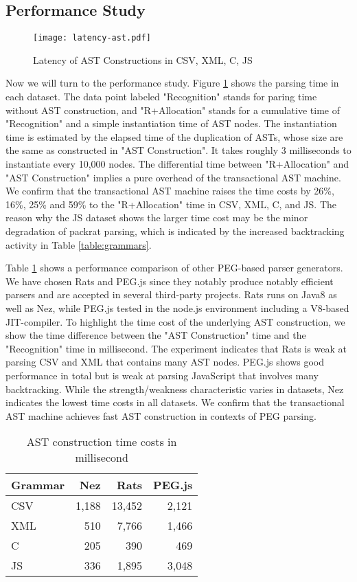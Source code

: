 \documentclass[JIP]{ipsj}
\begin{document}
\subsection{Performance Study}

\begin{figure}[tb]
\texttt{[image: latency-ast.pdf]}
\caption{Latency of AST Constructions in CSV, XML, C, JS}
\label{fig:latency}
\end{figure}

Now we will turn to the performance study. 
Figure \ref{fig:latency} shows the parsing time in each dataset. The data point labeled "Recognition" stands for paring time without AST construction, and "R+Allocation" stands for a cumulative time of "Recognition" and a simple instantiation time of AST nodes. The instantiation time is estimated by the elapsed time of the duplication of ASTs, whose size are the same as constructed in "AST Construction". It takes roughly 3 milliseconds to instantiate every 10,000 nodes. The differential time between "R+Allocation" and "AST Construction" implies a pure overhead of the transactional AST machine. We confirm that the transactional AST machine raises the time costs by 26\%, 16\%, 25\% and 59\% to the "R+Allocation" time in CSV, XML, C, and JS. The reason why the JS dataset shows the larger time cost may be the minor degradation of packrat parsing, which is indicated by the increased backtracking activity in Table \ref{table:grammars}.  

Table \ref {table:pegs} shows a performance comparison of other PEG-based parser generators. We have chosen Rats and PEG.js since they notably produce notably efficient parsers and are accepted in several third-party projects. Rats runs on Java8 as well as Nez, while PEG.js tested in the node.js environment including a V8-based JIT-compiler. To highlight the time cost of the underlying AST construction, we show the time difference between the "AST Construction" time and the "Recognition" time in millisecond. The experiment indicates that Rats is weak at parsing CSV and XML that contains many AST nodes. PEG.js shows good performance in total but is weak at parsing JavaScript that involves many backtracking. While the strength/weakness characteristic varies in datasets, Nez indicates the lowest time costs in all datasets. We confirm that the transactional AST machine achieves fast AST construction in contexts of PEG parsing. 

\begin{table}
\caption{AST construction time costs in millisecond  }
\label{table:pegs}
\begin{center}
\begin{tabular}{l|rrr} \hline
Grammar & Nez & Rats & PEG.js \\ \hline
CSV & 1,188 & 13,452 & 2,121 \\ 
XML & 510 & 7,766 & 1,466 \\
C & 205 & 390 & 469 \\
JS & 336 & 1,895 & 3,048 \\ \hline
\end{tabular}
\end{center}
\end{table}
\end{document}
